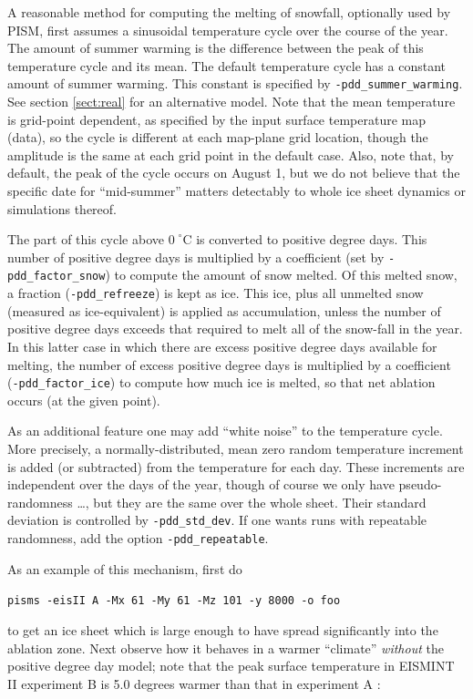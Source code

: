 \documentclass[11pt,final]{amsart}
\begin{document}
A reasonable method for computing the melting of snowfall, optionally used by PISM, first assumes a sinusoidal temperature cycle over the course of the year.  The amount of summer warming is the difference between the peak of this temperature cycle and its mean.  The default temperature cycle has a constant amount of summer warming.  This constant is specified by \verb|-pdd_summer_warming|.  See section \ref{sect:real} for an alternative model.  Note that the mean temperature is grid-point dependent, as specified by the input surface temperature map (data), so the cycle is different at each map-plane grid location, though the amplitude is the same at each grid point in the default case.  Also, note that, by default, the peak of the cycle occurs on August 1, but we do not believe that the specific date for ``mid-summer'' matters detectably to whole ice sheet dynamics or simulations thereof.

The part of this cycle above $0\!\phantom{|}^\circ \text{C}$ is converted to positive degree days.  This number of positive degree days is multiplied by a coefficient (set by \verb|-pdd_factor_snow|) to compute the amount of snow melted.  Of this melted snow, a fraction (\verb|-pdd_refreeze|) is kept as ice.  This ice, plus all unmelted snow (measured as ice-equivalent) is applied as accumulation, unless the number of positive degree days exceeds that required to melt all of the snow-fall in the year.  In this latter case in which there are excess positive degree days available for melting, the number of excess positive degree days is multiplied by a coefficient (\verb|-pdd_factor_ice|) to compute how much ice is melted, so that net ablation occurs (at the given point).

As an additional feature one may add ``white noise'' to the temperature cycle.  More precisely, a normally-distributed, mean zero random temperature increment is added (or subtracted) from the temperature for each day.  These increments are independent over the days of the year, though of course we only have pseudo-randomness \dots, but they are the same over the whole sheet.  Their standard deviation is controlled by \verb|-pdd_std_dev|.  If one wants runs with repeatable randomness, add the option \verb|-pdd_repeatable|.

As an example of this mechanism, first do

\verb|pisms -eisII A -Mx 61 -My 61 -Mz 101 -y 8000 -o foo|

\noindent to get an ice sheet which is large enough to have spread significantly into the ablation zone.  Next observe how it behaves in a warmer ``climate'' \emph{without} the positive degree day model; note that the peak surface temperature in EISMINT II experiment B is 5.0 degrees warmer than that in experiment A \cite{EISMINT00}:
\end{document}
